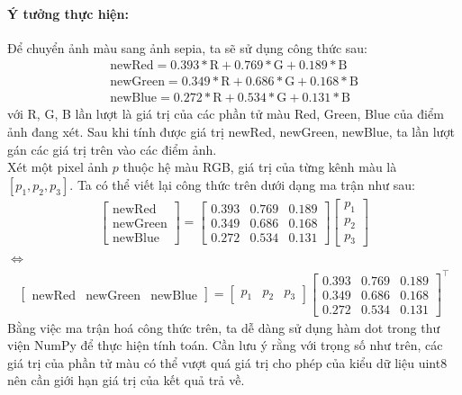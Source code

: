 \documentclass{article}
\begin{document}
\paragraph{Ý tưởng thực hiện:} Để chuyển ảnh màu sang ảnh sepia, ta sẽ sử dụng công thức sau:
\begin{align*}
  \text{newRed} = 0.393*\text{R} + 0.769*\text{G} + 0.189*\text{B} \\
  \text{newGreen} = 0.349*\text{R} + 0.686*\text{G} + 0.168*\text{B} \\
  \text{newBlue} = 0.272*\text{R} + 0.534*\text{G} + 0.131*\text{B} 
\end{align*}
với R, G, B lần lượt là giá trị của các phần tử màu Red, Green, Blue của điểm ảnh đang xét. Sau khi tính được giá trị newRed, newGreen, newBlue, ta lần lượt gán các giá trị trên vào các điểm ảnh. \\
Xét một pixel ảnh $p$ thuộc hệ màu RGB, giá trị của từng kênh màu là $[p_{1}, p_{2}, p_{3}]$. Ta có thể viết lại công thức trên dưới dạng ma trận như sau:
\begin{align*}
  \begin{bmatrix}
    \text{newRed} \\
    \text{newGreen} \\
    \text{newBlue}
  \end{bmatrix}
  =
  \begin{bmatrix}
    0.393 & 0.769 & 0.189 \\
    0.349 & 0.686 & 0.168 \\
    0.272 & 0.534 & 0.131
  \end{bmatrix}
  \begin{bmatrix}
    p_{1} \\
    p_{2} \\
    p_{3}
  \end{bmatrix}
\end{align*}
$\Leftrightarrow$
\begin{align*}
  \begin{bmatrix}
    \text{newRed} & \text{newGreen} & \text{newBlue}
  \end{bmatrix}
  =
  \begin{bmatrix}
    p_{1} & p_{2} & p_{3}
  \end{bmatrix}
  \begin{bmatrix}
    0.393 & 0.769 & 0.189 \\
    0.349 & 0.686 & 0.168 \\
    0.272 & 0.534 & 0.131
  \end{bmatrix}^\top
\end{align*}
Bằng việc ma trận hoá công thức trên, ta dễ dàng sử dụng hàm dot trong thư viện NumPy để thực hiện tính toán. Cần lưu ý rằng với trọng số như trên, các giá trị của phần tử màu có thể vượt quá giá trị cho phép của kiểu dữ liệu uint8 nên cần giới hạn giá trị của kết quả trả về.
\end{document}
